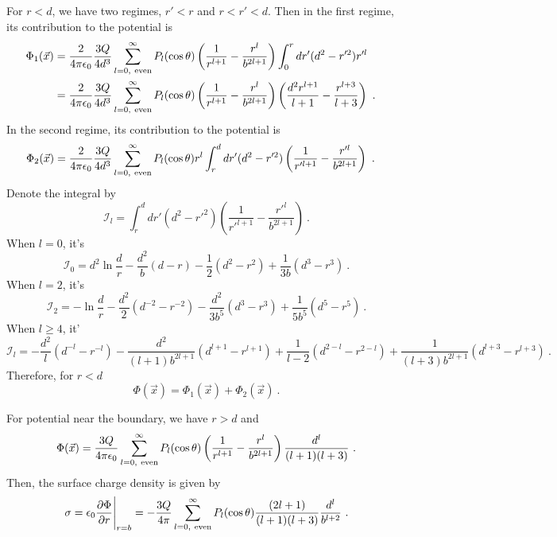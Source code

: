 \documentclass[12pt]{article}
\begin{document}
For $r < d$, we have two regimes, $r' < r$ and $r < r' < d$. Then in the first regime, its contribution to the potential is
\begin{align}
    \Phi_1(\vec x) &= \frac{2}{4\pi \epsilon_0} \frac{3Q}{4d^3} \sum_{l = 0,~{\rm even}}^\infty P_l(\cos \theta) \left(\frac{1}{r^{l+1}} - \frac{r^l}{b^{2l+1}}\right) \int_0^r dr' (d^2 - r'^2) r'^l\cr
    &=\frac{2}{4\pi \epsilon_0} \frac{3Q}{4d^3} \sum_{l = 0,~{\rm even}}^\infty P_l(\cos \theta) \left(\frac{1}{r^{l+1}} - \frac{r^l}{b^{2l+1}}\right) \left(\frac{d^2 r^{l+1} }{l+1} - \frac{r^{l+3}}{l+3} \right)~.
\end{align}
In the second regime, its contribution to the potential is
\begin{align}
    \Phi_2(\vec x) &= \frac{2}{4\pi \epsilon_0} \frac{3Q}{4d^3} \sum_{l = 0,~{\rm even}}^\infty P_l(\cos \theta) r^l \int_r^d dr' (d^2 - r'^2) \left(\frac{1}{r'^{l+1}} - \frac{r'^l}{b^{2l+1}}\right)~.
\end{align}
Denote the integral by
\begin{equation}
    \mathcal I_l = \int_r^d dr' (d^2 - r'^2) \left(\frac{1}{r'^{l+1}} - \frac{r'^l}{b^{2l+1}}\right)~.
\end{equation}
When $l = 0$, it's
\begin{equation}
    \mathcal I_0 = d^2 \ln \frac dr - \frac{d^2}{b}(d-r) - \frac 12(d^2 - r^2) + \frac{1}{3b}(d^3 - r^3)~.
\end{equation}
When $l = 2$, it's
\begin{equation}
    \mathcal I_2 = -\ln\frac{d}{r} - \frac{d^2}{2}(d^{-2} - r^{-2}) - \frac{d^2}{3b^5}(d^3 - r^3) + \frac{1}{5 b^5}(d^5 - r^5)~.
\end{equation}
When $l \ge 4$, it'
\begin{equation}
    \mathcal I_l = -\frac{d^2}{l}(d^{-l} - r^{-l}) - \frac{d^2}{(l+1) b^{2l+1}} (d^{l+1} - r^{l+1}) + \frac{1}{l-2} (d^{2-l} - r^{2-l}) + \frac{1}{(l+3) b^{2l+1}} (d^{l+3} - r^{l+3})~.
\end{equation}
Therefore, for $r< d$
\begin{equation}
    \Phi(\vec x) = \Phi_1(\vec x) + \Phi_2(\vec x)~.
\end{equation}

\newpage
{} For potential near the boundary, we have $r> d$ and
\begin{equation}
    \Phi(\vec x) = \frac{3Q}{4\pi \epsilon_0} \sum_{l= 0,~{\rm even}}^\infty P_l(\cos \theta) \left(\frac{1}{r^{l+1}} - \frac{r^l}{b^{2l+1}}\right) \frac{d^l}{(l+1)(l+3)}~.
\end{equation}
Then, the surface charge density is given by
\begin{align}
    \sigma = \epsilon_0 \frac{\partial \Phi}{\partial r}\Bigg|_{r = b} = - \frac{3Q}{4\pi} \sum_{l = 0, ~{\rm even}}^\infty P_l(\cos\theta) \frac{(2l+1)}{(l+1)(l+3)} \frac{d^l}{b^{l+2}}~.
\end{align}
\end{document}
